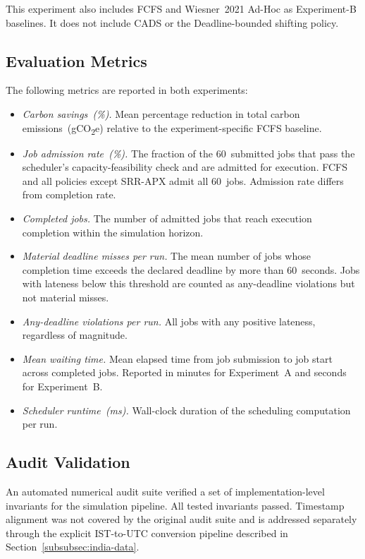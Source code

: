 \documentclass[conference]{IEEEtran}
\begin{document}
This experiment also includes FCFS and Wiesner~2021 Ad-Hoc as Experiment-B
baselines. It does not include CADS or the Deadline-bounded shifting policy.

\subsection{Evaluation Metrics}

The following metrics are reported in both experiments:

\begin{itemize}
  \item \textit{Carbon savings~(\%).} Mean percentage reduction in total
        carbon emissions~(gCO\textsubscript{2}e) relative to the
        experiment-specific FCFS baseline.
  \item \textit{Job admission rate~(\%).} The fraction of the 60~submitted
        jobs that pass the scheduler's capacity-feasibility check and are
        admitted for execution. FCFS and all policies except SRR-APX admit
        all 60~jobs. Admission rate differs from completion rate.
  \item \textit{Completed jobs.} The number of admitted jobs that reach
        execution completion within the simulation horizon.
  \item \textit{Material deadline misses per run.} The mean number of jobs
        whose completion time exceeds the declared deadline by more than
        60~seconds. Jobs with lateness below this threshold are counted as
        any-deadline violations but not material misses.
  \item \textit{Any-deadline violations per run.} All jobs with any positive
        lateness, regardless of magnitude.
  \item \textit{Mean waiting time.} Mean elapsed time from job submission to
        job start across completed jobs. Reported in minutes for
        Experiment~A and seconds for Experiment~B.
  \item \textit{Scheduler runtime~(ms).} Wall-clock duration of the
        scheduling computation per run.
\end{itemize}

\subsection{Audit Validation}

An automated numerical audit suite verified a set of implementation-level
invariants for the simulation pipeline. All tested invariants passed.
Timestamp alignment was not covered by the original audit suite and is
addressed separately through the explicit IST-to-UTC conversion pipeline
described in Section~\ref{subsubsec:india-data}.
\end{document}
